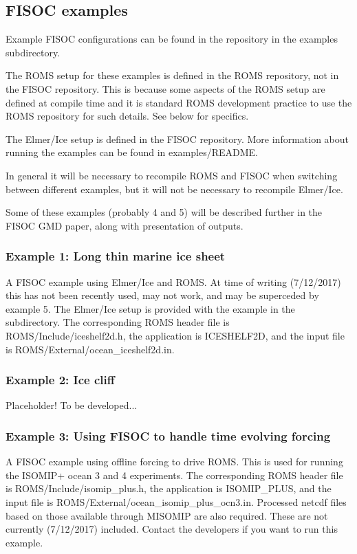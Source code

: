 \documentclass[11pt]{article}
\begin{document}
\subsection{FISOC examples}

Example FISOC configurations can be found in the repository in the 
examples subdirectory. 

The ROMS setup for these examples is defined in the ROMS repository, not in the 
FISOC repository.  This is because some aspects of the ROMS setup are defined at 
compile time and it is standard ROMS development practice to use the ROMS 
repository for such details.  See below for specifics. 

The Elmer/Ice setup is defined in the FISOC 
repository.  
More information about running the examples can be found in 
examples/README.

In general it will be necessary to recompile ROMS and FISOC 
when switching between different examples, but it will not be necessary 
to recompile Elmer/Ice.

Some of these examples (probably 4 and 5) will be 
described further in the FISOC GMD paper, 
along with presentation of outputs.



\subsubsection{Example 1: Long thin marine ice sheet}
A FISOC example using Elmer/Ice and ROMS. 
At time of writing (7/12/2017) this has not been 
recently used, may not work, and may be superceded by 
example 5. 
The Elmer/Ice setup is provided with the example in the subdirectory. 
The corresponding ROMS header file is ROMS/Include/iceshelf2d.h, 
the application is ICESHELF2D, and 
the input file is ROMS/External/ocean\_iceshelf2d.in.

\subsubsection{Example 2: Ice cliff}
Placeholder!  To be developed...

\subsubsection{Example 3: Using FISOC to handle time evolving forcing}
A FISOC example using offline forcing to drive ROMS. 
This is used for running the ISOMIP+ ocean 3 and 4 experiments.
The corresponding ROMS header file is ROMS/Include/isomip\_plus.h, 
the application is ISOMIP\_PLUS, 
and the input file is ROMS/External/ocean\_isomip\_plus\_ocn3.in.
Processed netcdf files based on those available through MISOMIP 
are also required.  These are not currently (7/12/2017) 
included.  Contact the developers if you want to run this example. 
\end{document}
